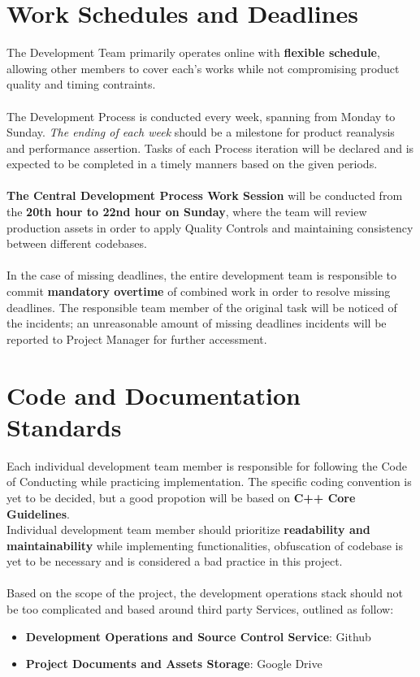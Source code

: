     \section{Work Schedules and Deadlines}
    The Development Team primarily operates online with \textbf{flexible schedule}, allowing other members to cover each's works while not compromising product quality
    and timing contraints.
    \\\\
    The Development Process is conducted every week, spanning from Monday to Sunday. \textit{The ending of each week} should be a milestone for product reanalysis and 
    performance assertion. Tasks of each Process iteration will be declared and is expected to be completed in a timely manners based on the given periods.
    \\\\
    \textbf{The Central Development Process Work Session} will be conducted from the \textbf{20th hour to 22nd hour on Sunday}, where the team will review production assets in order
    to apply Quality Controls and maintaining consistency between different codebases.
    \\\\
    In the case of missing deadlines, the entire development team is responsible to commit \textbf{mandatory overtime} of combined work in order to resolve missing deadlines.
    The responsible team member of the original task will be noticed of the incidents; an unreasonable amount of missing deadlines incidents will be reported to Project
    Manager for further accessment.

    \section{Code and Documentation Standards}
    Each individual development team member is responsible for following the Code of Conducting while practicing implementation. The specific coding convention
    is yet to be decided, but a good propotion will be based on \textbf{C++ Core Guidelines}.
    \\
    Individual development team member should prioritize \textbf{readability and maintainability} while implementing functionalities, obfuscation of codebase is yet to be
    necessary and is considered a bad practice in this project.
    \\\\
    Based on the scope of the project, the development operations stack should not be too complicated and based around third party Services, outlined as follow:
    \begin{itemize}
        \item \textbf{Development Operations and Source Control Service}: Github
        \item \textbf{Project Documents and Assets Storage}: Google Drive
    \end{itemize}

